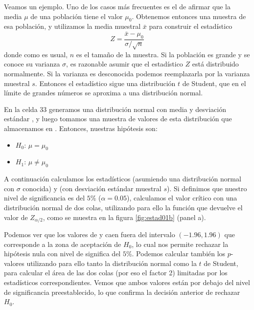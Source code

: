 Veamos un ejemplo. Uno de los casos más frecuentes es el de afirmar que la media $\mu$ de una población tiene el valor $\mu_0$. Obtenemos entonces una muestra de esa población, y utilizamos la media muestral $\bar{x}$ para construir el estadístico
\[ Z = \frac{\bar{x} - \mu_0}{\sigma / \sqrt{n}} \]
donde como es usual, $n$ es el tamaño de la muestra. Si la población es grande y se conoce su varianza $\sigma$, es razonable asumir que el estadístico $Z$ está distribuido normalmente. Si la varianza es desconocida podemos reemplazarla por la varianza muestral $s$. Entonces el estadístico sigue una distribución $t$ de Student, que en el límite de grandes números se aproxima a una distribución normal.

En la celda 33 generamos una distribución normal  con media  y desviación estándar , y luego tomamos una muestra de  valores de esta distribución que almacenamos en . Entonces, nuestras hipótesis son:
\begin{itemize}
 \item $H_0$: $\mu = \mu_0$
 \item $H_1$: $\mu \neq \mu_0$
\end{itemize}



A continuación calculamos los estadísticos  (asumiendo una distribución normal con $\sigma$ conocida) y  (con desviación estándar muestral $s$). Si definimos que nuestro nivel de significancia es del $5$\% ($\alpha = 0.05$), calculamos el valor crítico con una distribución normal de dos colas, utilizando para ello la función  que devuelve el valor de $Z_{\alpha/2}$, como se muestra en la figura \ref{fig:estad01b} (panel a).


Podemos ver que los valores de  y  caen fuera del intervalo $(-1.96, 1.96)$ que corresponde a la zona de aceptación de $H_0$, lo cual nos permite rechazar la hipótesis nula con nivel de significa del $5$\%. Podemos calcular también los $p$-valores utilizando para ello tanto la distribución normal como la $t$ de Student, para calcular el área de las dos colas (por eso el factor 2) limitadas por los estadísticos correspondientes. Vemos que ambos valores están por debajo del nivel de significancia preestablecido, lo que confirma la decisión anterior de rechazar $H_0$.

